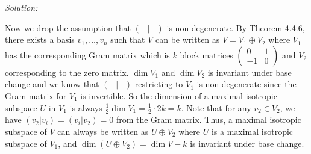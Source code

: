 \documentclass[a4paper, 12pt]{article}
\newenvironment{solution}
    {\textit{Solution:}}
    {}
\begin{document}
\begin{solution}
\par 
Now we drop the assumption that \((-|-)\) is non-degenerate. By Theorem 4.4.6, there exists a basis \(v_1,\ldots,v_n\) such that \(V\) can be written as \(V=V_1\oplus V_2\) where \(V_1\) has the corresponding Gram matrix which is \(k\) block matrices \(\begin{pmatrix}
	0 & 1\\ 
	-1 & 0
\end{pmatrix}\) and \(V_2\) corresponding to the zero matrix. \(\dim V_1\) and \(\dim V_2\) is invariant under base change and we know that \((-|-)\) restricting to \(V_1\) is non-degenerate since the Gram matrix for \(V_1\) is invertible. So the dimension of a maximal isotropic subspace \(U\) in \(V_1\) is always \(\frac{1}{2}\dim V_1=\frac{1}{2}\cdot 2k=k\). Note 
that for any \(v_2\in V_2\), we have \((v_2|v_i)=(v_i|v_2)=0\) from the Gram matrix. Thus, a maximal isotropic subspace of \(V\) can always be written as \(U\oplus V_2\) where \(U\) is a maximal isotropic subspace of \(V_1\), and \(\dim (U\oplus V_2)=\dim V-k\) is invariant under base change. 	
\end{solution}
\end{document}
